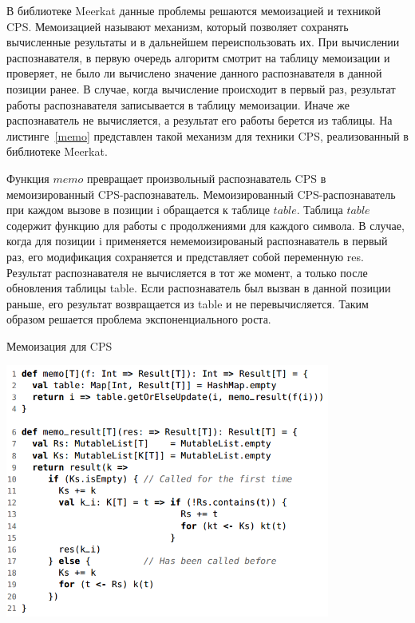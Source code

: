 В библиотеке Meerkat данные проблемы решаются мемоизацией и техникой CPS. Мемоизацией называют механизм, который позволяет сохранять вычисленные результаты и в дальнейшем переиспользовать их. При вычислении распознавателя, в первую очередь алгоритм смотрит на таблицу мемоизации и проверяет, не было ли вычислено значение данного распознавателя в данной позиции ранее. В случае, когда вычисление происходит в первый раз, результат работы распознавателя записывается в таблицу мемоизации. Иначе же распознаватель не вычисляется, а результат его работы берется из таблицы. На листинге~\ref{memo} представлен такой механизм для техники CPS, реализованный в библиотеке Meerkat.

 Функция $memo$ превращает произвольный распознаватель CPS в мемоизированный CPS-распознаватель. Мемоизированный CPS-распознаватель при каждом вызове в позиции i обращается к таблице $table$. Таблица $table$ содержит функцию для работы с продолжениями для каждого символа. В случае, когда для позиции i применяется немемоизированый распознаватель в первый раз, его модификация сохраняется и представляет собой переменную res. Результат распознавателя не вычисляется в тот же момент, а только после обновления таблицы table. Если распознаватель был вызван в данной позиции раньше, его результат возвращается из table и не перевычисляется. Таким образом решается проблема экспоненциального роста.

\begin{listing}
\caption{Мемоизация для CPS}
\label{memo}
\centering
\includegraphics[width=0.8\textwidth]{Smolina/pics/memo.png}
\end{listing}

